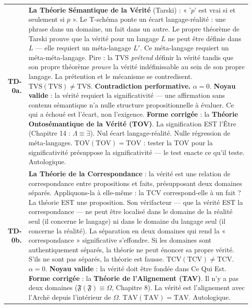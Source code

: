 \documentclass[10pt, openany, oneside]{book}
\renewcommand{\footnotesize}{\fontsize{8.5}{11}\selectfont}
\begin{document}
{\footnotesize
\noindent\begin{tabular}{r p{}}
\textbf{TD-0a.} & \textbf{La Théorie Sémantique de la Vérité} (Tarski) : « '$p$' est vrai si et seulement si $p$ ». Le T-schéma ponte un écart langage-réalité : une phrase dans un domaine, un fait dans un autre. Le propre théorème de Tarski prouve que la vérité pour un langage $L$ ne peut être définie dans $L$ --- elle requiert un méta-langage $L'$. Ce méta-langage requiert un méta-méta-langage. Pire : la TVS \textit{prétend} définir la vérité tandis que son propre théorème \textit{prouve} la vérité indéfinissable au sein de son propre langage. La prétention et le mécanisme se contredisent. $\text{TVS}(\text{TVS}) \neq \text{TVS}$. \textbf{Contradiction performative.} $\alpha = 0$. \textbf{Noyau valide} : la vérité requiert la significativité --- une affirmation sans contenu sémantique n'a nulle structure propositionnelle à évaluer. Ce qui a échoué est l'écart, non l'exigence. \textbf{Forme corrigée} : la \textbf{Théorie Ontosémantique de la Vérité (TOV)}. La signification EST l'Être (Chapitre 14 : $\Lambda \equiv \exists$). Nul écart langage-réalité. Nulle régression de méta-langages. $\text{TOV}(\text{TOV}) = \text{TOV}$ : tester la TOV pour la significativité présuppose la significativité --- le test enacte ce qu'il teste. Autologique. \\[0.5em]
\textbf{TD-0b.} & \textbf{La Théorie de la Correspondance} : la vérité est une relation de correspondance entre propositions et faits, présupposant deux domaines séparés. Appliquons-la à elle-même : la TCV correspond-elle à un fait ? La théorie EST une proposition. Son vérifacteur --- que la vérité EST la correspondance --- ne peut être localisé dans le domaine de la réalité seul (il concerne le langage) ni dans le domaine du langage seul (il concerne la réalité). La séparation en deux domaines qui rend la « correspondance » significative s'effondre. Si les domaines sont authentiquement séparés, la théorie ne peut énoncer sa propre vérité. S'ils ne sont pas séparés, la théorie est fausse. $\text{TCV}(\text{TCV}) \neq \text{TCV}$. $\alpha = 0$. \textbf{Noyau valide} : la vérité doit être fondée dans Ce Qui Est. \textbf{Forme corrigée} : la \textbf{Théorie de l'Alignement (TAV)}. Il n'y a pas deux domaines ($\mathfrak{F}(\mathfrak{F}) \equiv \Omega$, Chapitre 8). La vérité est l'alignement avec l'Arch\={e} depuis l'intérieur de $\Omega$. $\text{TAV}(\text{TAV}) = \text{TAV}$. Autologique. \\[0.5em]

\end{tabular}}
\end{document}
